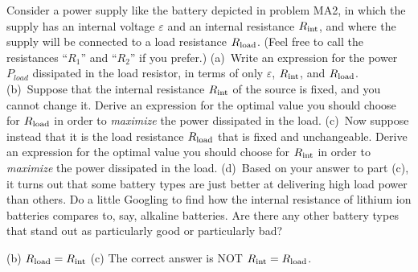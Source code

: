 \begin{Exercise}
\label{prob_impedance_matching}
Consider a power supply like the battery depicted in problem MA2, in which the supply has an internal voltage $\varepsilon$ and an internal resistance $R_{\rm int}$, and where the supply will be connected to a load resistance $R_{\rm load}$.  (Feel free to call the resistances ``$R_1$'' and ``$R_2$'' if you prefer.)
(a)~Write an expression for the power $P_{load}$ dissipated in the load resistor, 
in terms of only $\varepsilon$, $R_{\rm int}$, and $R_{\rm load}$.  
(b)~Suppose that the internal resistance $R_{\rm int}$ of the source is fixed, and you cannot change it.  Derive an expression for the optimal value you should choose for $R_{\rm load}$ in order to \textit{maximize} the power dissipated in the load.
(c)~Now suppose instead that it is the load resistance $R_{\rm load}$ that is fixed and unchangeable.  Derive an expression for the optimal value you should choose for $R_{\rm int}$ in order to \textit{maximize} the power dissipated in the load.
(d)~Based on your answer to part (c), it turns out that some battery types are just better at delivering high load power than others.  Do a little Googling to find how the internal resistance of lithium ion batteries compares to, say, alkaline batteries.  Are there any other battery types that stand out as particularly good or particularly bad?
\end{Exercise}
\begin{Answer}
(b) $R_{\rm load} = R_{\rm int}$ (c) The correct answer is NOT $R_{\rm int} = R_{\rm load}$.
\end{Answer}

